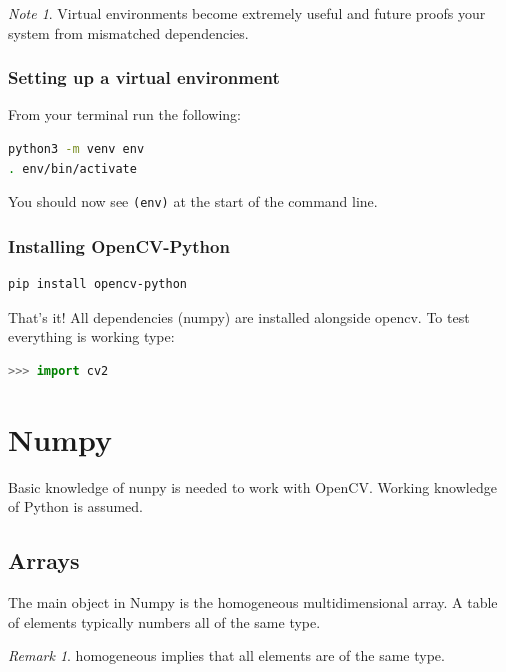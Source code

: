 \documentclass{article}
\theoremstyle{definition}
\theoremstyle{remark}
\newtheorem*{rem}{Remark}
\newtheorem*{nb}{Note}
\begin{document}
\begin{nb}
Virtual environments become extremely useful and future proofs your system from mismatched dependencies. 
\end{nb}

\subsubsection{Setting up a virtual environment}

From your terminal run the following: 
\begin{lstlisting}[language=bash]
python3 -m venv env
. env/bin/activate
\end{lstlisting}

You should now see \lstinline{(env)} at the start of the command line.


\subsubsection{Installing OpenCV-Python}

\begin{lstlisting}[language=bash]
pip install opencv-python
\end{lstlisting}


That's it! All dependencies (numpy) are installed alongside opencv. To test everything is working type:
\begin{lstlisting}[language=Python]
>>> import cv2
\end{lstlisting}




\break





\section{Numpy}

Basic knowledge of nunpy is needed to work with OpenCV. Working knowledge of Python is assumed.

\subsection{Arrays}

The main object in Numpy is the homogeneous multidimensional array. A table of elements typically numbers all of the same type.

\begin{rem}
homogeneous implies that all elements are of the same type.
\end{rem}
\end{document}
